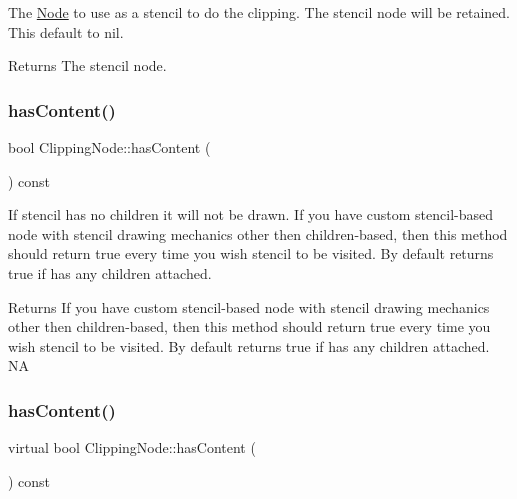 The \hyperlink{classNode}{Node} to use as a stencil to do the clipping. The stencil node will be retained. This default to nil.

\begin{DoxyReturn}{Returns}
The stencil node. 
\end{DoxyReturn}
\mbox{\label{classClippingNode_a1592e959ae03a1ed1e5b91cd05b17465}} 
\subsubsection{\texorpdfstring{has\+Content()}{hasContent()}\hspace{0.1cm}{\footnotesize\ttfamily [1/2]}}
{\footnotesize\ttfamily bool Clipping\+Node\+::has\+Content (\begin{DoxyParamCaption}{ }\end{DoxyParamCaption}) const\hspace{0.3cm}{\ttfamily [virtual]}}

If stencil has no children it will not be drawn. If you have custom stencil-\/based node with stencil drawing mechanics other then children-\/based, then this method should return true every time you wish stencil to be visited. By default returns true if has any children attached.

\begin{DoxyReturn}{Returns}
If you have custom stencil-\/based node with stencil drawing mechanics other then children-\/based, then this method should return true every time you wish stencil to be visited. By default returns true if has any children attached.  NA 
\end{DoxyReturn}
\mbox{\label{classClippingNode_aeb2fdeb408f7e1b5c1f42b168c0c4e06}} 
\subsubsection{\texorpdfstring{has\+Content()}{hasContent()}\hspace{0.1cm}{\footnotesize\ttfamily [2/2]}}
{\footnotesize\ttfamily virtual bool Clipping\+Node\+::has\+Content (\begin{DoxyParamCaption}{ }\end{DoxyParamCaption}) const\hspace{0.3cm}{\ttfamily [virtual]}}

